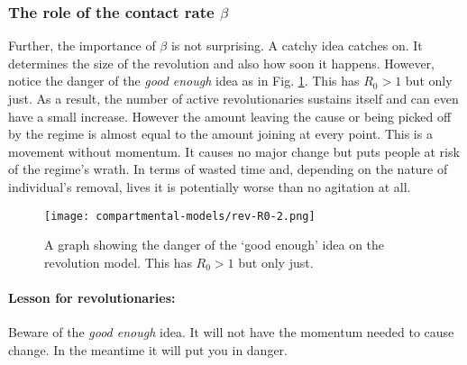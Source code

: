 \subsubsection{The role of the contact rate $\beta$}
Further, the importance of $\beta$ is not surprising. A catchy idea catches on. It determines the size of the revolution and also how soon it happens. However, notice the danger of the \textit{good enough} idea as in Fig. \ref{fig:rev-R0-2}. This has $R_0>1$ but only just. As a result, the number of active revolutionaries sustains itself and can even have a small increase. However the amount leaving the cause or being picked off by the regime is almost equal to the amount joining at every point. This is a movement without momentum. It causes no major change but puts people at risk of the regime's wrath. In terms of wasted time and, depending on the nature of individual's removal, lives it is potentially worse than no agitation at all.
\begin{figure}[h!]
	\centering
	\texttt{[image: compartmental-models/rev-R0-2.png]}
	\caption{A graph showing the danger of the `good enough' idea on the revolution model. This has $R_0>1$ but only just.}
	\label{fig:rev-R0-2}
\end{figure}
	
\begin{tcolorbox}
	\paragraph{Lesson for revolutionaries:} Beware of the \textit{good enough} idea. It will not have the momentum needed to cause change. In the meantime it will put you in danger.
\end{tcolorbox}
